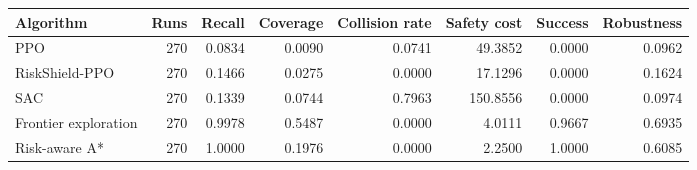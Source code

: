 \begin{tabular}{lrrrrrrr}
\toprule
Algorithm & Runs & Recall & Coverage & Collision rate & Safety cost & Success & Robustness \\
\midrule
PPO & 270 & 0.0834 & 0.0090 & 0.0741 & 49.3852 & 0.0000 & 0.0962 \\
RiskShield-PPO & 270 & 0.1466 & 0.0275 & 0.0000 & 17.1296 & 0.0000 & 0.1624 \\
SAC & 270 & 0.1339 & 0.0744 & 0.7963 & 150.8556 & 0.0000 & 0.0974 \\
Frontier exploration & 270 & 0.9978 & 0.5487 & 0.0000 & 4.0111 & 0.9667 & 0.6935 \\
Risk-aware A* & 270 & 1.0000 & 0.1976 & 0.0000 & 2.2500 & 1.0000 & 0.6085 \\
\bottomrule
\end{tabular}
